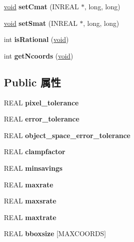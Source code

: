 \begin{DoxyCompactItemize}
\mbox{\label{class_mapdesc_ae89266cfb012b653a3f374b8a2ffe513}} 
\hyperlink{interfacevoid}{void} {\bfseries set\+Cmat} (I\+N\+R\+E\+AL $\ast$, long, long)
\item 
\mbox{\label{class_mapdesc_ac0dd5e41a22ae26a1fcd91f08c269dc5}} 
\hyperlink{interfacevoid}{void} {\bfseries set\+Smat} (I\+N\+R\+E\+AL $\ast$, long, long)
\item 
\mbox{\label{class_mapdesc_a2e6586cfc281a02b99fcee49b5bba3b2}} 
int {\bfseries is\+Rational} (\hyperlink{interfacevoid}{void})
\item 
\mbox{\label{class_mapdesc_a9b113c36c0e1868de54d88a593204823}} 
int {\bfseries get\+Ncoords} (\hyperlink{interfacevoid}{void})
\end{DoxyCompactItemize}
\subsection*{Public 属性}
\begin{DoxyCompactItemize}
\item 
\mbox{\label{class_mapdesc_a309d3b16f5f1e6ea8c4b312de1291268}} 
R\+E\+AL {\bfseries pixel\+\_\+tolerance}
\item 
\mbox{\label{class_mapdesc_af3c745da90336a9db5ecebd12a22a5d7}} 
R\+E\+AL {\bfseries error\+\_\+tolerance}
\item 
\mbox{\label{class_mapdesc_a0f575f19ad2c45b8e1ed5f7a1971823e}} 
R\+E\+AL {\bfseries object\+\_\+space\+\_\+error\+\_\+tolerance}
\item 
\mbox{\label{class_mapdesc_a1e4654d7ecd79bfb4a47389fa4c8a22f}} 
R\+E\+AL {\bfseries clampfactor}
\item 
\mbox{\label{class_mapdesc_a472fe7c78a50fe32df3cb59f54c46d6e}} 
R\+E\+AL {\bfseries minsavings}
\item 
\mbox{\label{class_mapdesc_a5fa347711fdffb5996d5d151a9c45ec1}} 
R\+E\+AL {\bfseries maxrate}
\item 
\mbox{\label{class_mapdesc_a8a007390c2f0dbd6064807a5afdff53d}} 
R\+E\+AL {\bfseries maxsrate}
\item 
\mbox{\label{class_mapdesc_aedeb01c4c7c8e6a3f6596d27e94d65fe}} 
R\+E\+AL {\bfseries maxtrate}
\item 
\mbox{\label{class_mapdesc_a82dc5a906d18fea338d7995d7cbc074c}} 
R\+E\+AL {\bfseries bboxsize} \mbox{[}M\+A\+X\+C\+O\+O\+R\+DS\mbox{]}
\end{DoxyCompactItemize}

